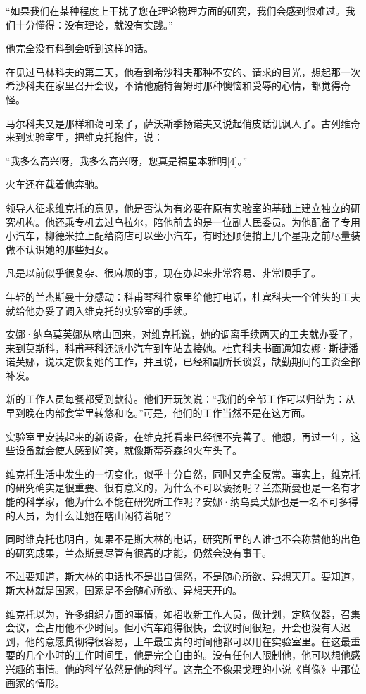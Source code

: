 “如果我们在某种程度上干扰了您在理论物理方面的研究，我们会感到很难过。我们十分懂得：没有理论，就没有实践。”

他完全没有料到会听到这样的话。

在见过马林科夫的第二天，他看到希沙科夫那种不安的、请求的目光，想起那一次希沙科夫在家里召开会议，不请他施特鲁姆时那种懊恼和受辱的心情，都觉得奇怪。

马尔科夫又是那样和蔼可亲了，萨沃斯季扬诺夫又说起俏皮话讥讽人了。古列维奇来到实验室里，把维克托抱住，说：

“我多么高兴呀，我多么高兴呀，您真是福星本雅明[4]。”

火车还在载着他奔驰。

领导人征求维克托的意见，他是否认为有必要在原有实验室的基础上建立独立的研究机构。他还乘专机去过乌拉尔，陪他前去的是一位副人民委员。为他配备了专用小汽车，柳德米拉上配给商店可以坐小汽车，有时还顺便捎上几个星期之前尽量装做不认识她的那些妇女。

凡是以前似乎很复杂、很麻烦的事，现在办起来非常容易、非常顺手了。

年轻的兰杰斯曼十分感动：科甫琴科往家里给他打电话，杜宾科夫一个钟头的工夫就给他办妥了调入维克托的实验室的手续。

安娜·纳乌莫芙娜从喀山回来，对维克托说，她的调离手续两天的工夫就办妥了，来到莫斯科，科甫琴科还派小汽车到车站去接她。杜宾科夫书面通知安娜·斯捷潘诺芙娜，说决定恢复她的工作，并且说，已经和副所长谈妥，缺勤期间的工资全部补发。

新的工作人员每餐都受到款待。他们开玩笑说：“我们的全部工作可以归结为：从早到晚在内部食堂里转悠和吃。”可是，他们的工作当然不是在这方面。

实验室里安装起来的新设备，在维克托看来已经很不完善了。他想，再过一年，这些设备就会使人感到好笑，就像斯蒂芬森的火车头了。

维克托生活中发生的一切变化，似乎十分自然，同时又完全反常。事实上，维克托的研究确实是很重要、很有意义的，为什么不可以褒扬呢？兰杰斯曼也是一名有才能的科学家，他为什么不能在研究所工作呢？安娜·纳乌莫芙娜也是一名不可多得的人员，为什么让她在喀山闲待着呢？

同时维克托也明白，如果不是斯大林的电话，研究所里的人谁也不会称赞他的出色的研究成果，兰杰斯曼尽管有很高的才能，仍然会没有事干。

不过要知道，斯大林的电话也不是出自偶然，不是随心所欲、异想天开。要知道，斯大林就是国家，国家是不会随心所欲、异想天开的。

维克托以为，许多组织方面的事情，如招收新工作人员，做计划，定购仪器，召集会议，会占用他不少时间。但小汽车跑得很快，会议时间很短，开会也没有人迟到，他的意愿贯彻得很容易，上午最宝贵的时间他都可以用在实验室里。在这最重要的几个小时的工作时间里，他是完全自由的。没有任何人限制他，他可以想他感兴趣的事情。他的科学依然是他的科学。这完全不像果戈理的小说《肖像》中那位画家的情形。

